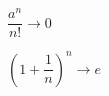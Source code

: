 \begin{blueBox}
  $
    \dfrac{a^n}{n!} \rightarrow 0
  $

  \hdashrule[.8ex][x]{\dimexpr\textwidth}{1pt}{2mm 3pt}
  \phantom{alma}\vspace{9.5cm}\phantom{alma}
\end{blueBox}

\begin{blueBox}
  $
    \left(1 + \dfrac{1}{n}\right)^n \rightarrow e
  $

  \hdashrule[.8ex][x]{\dimexpr\textwidth}{1pt}{2mm 3pt}
  \phantom{alma}\vspace{12.5cm}\phantom{alma}
\end{blueBox}